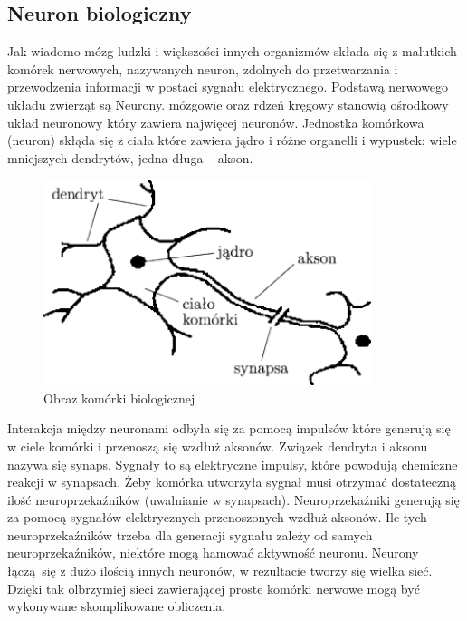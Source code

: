 \documentclass{article}
\begin{document}
\subsection{Neuron biologiczny}

Jak wiadomo mózg ludzki i większości innych organizmów składa się z malutkich komórek nerwowych, nazywanych neuron, zdolnych do przetwarzania i przewodzenia informacji w postaci sygnału elektrycznego. Podstawą nerwowego układu zwierząt są Neurony. mózgowie oraz rdzeń kręgowy stanowią ośrodkowy układ neuronowy który zawiera najwięcej neuronów. \cite{neuroscience}
Jednostka komórkowa (neuron) skłąda się z ciała które zawiera jądro i różne organelli i wypustek: wiele mniejszych dendrytów, jedna długa -- akson. \cite{geron}

\begin{figure}[H]
	\centering
	\includegraphics[width=\textwidth,height=6cm,keepaspectratio=true]{neuron_bio}
	\caption{
		Obraz komórki biologicznej \cite{neuron_bio}
	}
\end{figure}

Interakcja między neuronami odbyła się za pomocą impulsów które generują się w ciele komórki i przenoszą się  wzdłuż aksonów. Związek dendryta i aksonu nazywa się synaps. Sygnały to są elektryczne impulsy, które powodują chemiczne reakcji w synapsach. Żeby komórka utworzyła sygnał musi otrzymać dostateczną ilość neuroprzekaźników (uwalnianie w synapsach). Neuroprzekaźniki generują się za pomocą sygnałów elektrycznych przenoszonych wzdłuż aksonów. Ile tych neuroprzekaźników trzeba dla generacji sygnału zależy od samych neuroprzekaźników, niektóre mogą hamować aktywność neuronu.\cite{geron}
Neurony łączą się z dużo ilością innych neuronów, w rezultacie tworzy się wielka sieć. Dzięki tak olbrzymiej sieci zawierającej proste komórki nerwowe mogą być wykonywane skomplikowane obliczenia. \cite{geron}

\end{document}
